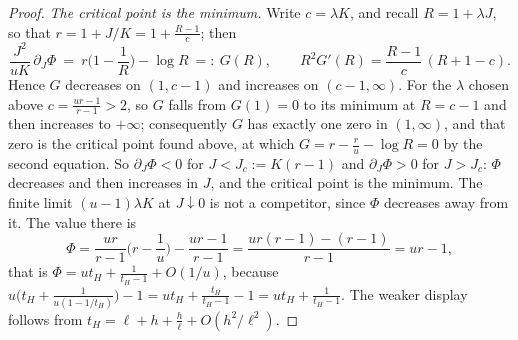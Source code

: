 \documentclass[12pt,oneside,reqno,fleqn]{amsart}
\numberwithin{equation}{section}
\theoremstyle{remark}
\newcommand{\1}{{\mathbf 1}}
\begin{document}
\begin{proof}
		\emph{The critical point is the minimum.} Write $c=\lambda K$, and recall $R=1+\lambda J$, so that $r=1+J/K=1+\frac{R-1}{c}$; then
		\[
			\frac{J^2}{uK}\,\partial_J\Phi\ =\ r\Big(1-\frac1R\Big)-\log R\ =:\ G(R),
			\qquad
			R^2G'(R)=\frac{R-1}{c}\,(R+1-c).
		\]
		Hence $G$ decreases on $(1,c-1)$ and increases on $(c-1,\infty)$. For the $\lambda$ chosen above $c=\frac{ur-1}{r-1}>2$, so $G$ falls from $G(1)=0$ to its minimum at $R=c-1$ and then increases to $+\infty$; consequently $G$ has exactly one zero in $(1,\infty)$, and that zero is the critical point found above, at which $G=r-\frac ru-\log R=0$ by the second equation. So $\partial_J\Phi<0$ for $J<J_c:=K(r-1)$ and $\partial_J\Phi>0$ for $J>J_c$: $\Phi$ decreases and then increases in $J$, and the critical point is the minimum. The finite limit $(u-1)\lambda K$ at $J\downarrow0$ is not a competitor, since $\Phi$ decreases away from it. The value there is
		\[
			\Phi=\frac{ur}{r-1}\Big(r-\frac1u\Big)-\frac{ur-1}{r-1}=\frac{ur(r-1)-(r-1)}{r-1}=ur-1,
		\]
		that is $\Phi=ut_H+\frac1{t_H-1}+O(1/u)$, because $u\big(t_H+\frac1{u(1-1/t_H)}\big)-1=ut_H+\frac{t_H}{t_H-1}-1=ut_H+\frac1{t_H-1}$. The weaker display follows from $t_H=\ell+h+\frac h\ell+O(h^2/\ell^2)$.
	\end{proof}
\end{document}
